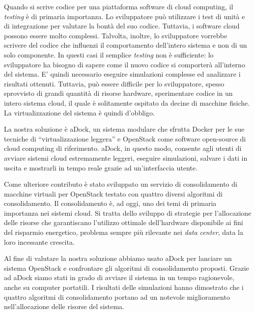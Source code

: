 \begin{spacing}{1.1}
Quando si scrive codice per una piattaforma software di cloud computing, il \emph{testing} è di primaria importanza. Lo sviluppatore può utilizzare i test di unità e di integrazione per valutare la bontà del suo codice. Tuttavia, i software cloud possono essere molto complessi. Talvolta, inoltre, lo sviluppatore vorrebbe scrivere del codice che influenzi il comportamento dell'intero sistema e non di un solo componente. In questi casi il semplice \emph{testing} non è sufficiente: lo sviluppatore ha bisogno di sapere come il nuovo codice si comporterà all'interno del sistema. E' quindi necessario eseguire simulazioni complesse ed analizzare i risultati ottenuti. Tuttavia, può essere difficile per lo sviluppatore, spesso sprovvisto di grandi quantità di risorse hardware, sperimentare codice in un intero sistema cloud, il quale è solitamente ospitato da decine di macchine fisiche. La virtualizzazione del sistema è quindi d'obbligo.

La nostra soluzione è aDock, un sistema modulare che sfrutta Docker per le sue tecniche di ``virtualizzazione leggera'' e OpenStack come software open-source di cloud computing di riferimento. aDock, in questo modo, consente agli utenti di avviare sistemi cloud estremamente leggeri, eseguire simulazioni, salvare i dati in uscita e mostrarli in tempo reale grazie ad un'interfaccia utente.

Come ulteriore contributo è stato sviluppato un servizio di consolidamento di macchine virtuali per OpenStack testato con quattro diversi algoritmi di consolidamento. Il consolidamento è, ad oggi, uno dei temi di primaria importanza nei sistemi cloud. Si tratta dello sviluppo di strategie per l'allocazione delle risorse che garantiscano l'utilizzo ottimale dell'hardware disponibile ai fini del risparmio energetico, problema sempre più rilevante nei \emph{data center}, data la loro incessante crescita.

Al fine di valutare la nostra soluzione abbiamo usato aDock per lanciare un sistema OpenStack e confrontare gli algoritmi di consolidamento proposti. Grazie ad aDock siamo stati in grado di avviare il sistema in un tempo ragionevole, anche su computer portatili. I risultati delle simulazioni hanno dimostrato che i quattro algoritmi di consolidamento portano ad un notevole miglioramento nell'allocazione delle risorse del sistema.
\end{spacing}